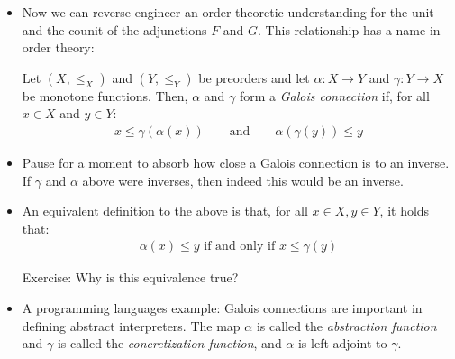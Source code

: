 \begin{itemize}
  We can also build the counit, which is a $\calD$-indexed family of morphisms in $\calD$:

  \begin{align*}
    \epsilon_A = \id_A \quad \epsilon_B = \id_B \quad \epsilon_C = B \to C 
  \end{align*}

  Intuitively, these two natural transformations are characterizing what happens 
  after round trips of following $F$ and $G$. The unit $\eta$ says that, after 
  following a round trip of $F$ and then $G$, we must end up ``in a higher place'' than we started;
  dually, the counit $\epsilon$ is saying that after a round trip of $G$ then $F$ 
  we must end up ``in a lower place'' than we started.

  \item Now we can reverse engineer an order-theoretic understanding for the 
  unit and the counit of the adjunctions $F$ and $G$.
  This relationship has a name in order theory:

  \begin{definition}
    Let $(X, \le_X)$ and $(Y, \le_Y)$  be preorders and let $\alpha : X \to Y$ 
    and $\gamma : Y \to X$ be monotone functions. Then, $\alpha$ and 
    $\gamma$ form a \emph{Galois connection} if, for all $x \in X$ and $y \in Y$:
    \begin{align*}
      x \le \gamma(\alpha(x))  \qquad \text{and} \qquad \alpha(\gamma(y)) \le y
    \end{align*}
  \end{definition}

  \item Pause for a moment to absorb how close a Galois connection is to an inverse. 
  If $\gamma$ and $\alpha$ above were inverses, then indeed this would be 
  an inverse.

  \item An equivalent definition to the above is that, for all $x \in X, y \in Y$, 
  it holds that:
  \begin{align}
    \alpha(x) \le y \text{ if and only if } x \le \gamma(y)
    \label{eq:galois-hom}
  \end{align}

  Exercise: Why is this equivalence true? 

  \item A programming languages example: Galois connections are important in defining 
  abstract interpreters. The map $\alpha$ is called the \emph{abstraction function} and 
  $\gamma$ is called the \emph{concretization function}, and $\alpha$ is left adjoint to $\gamma$.



\end{itemize}

